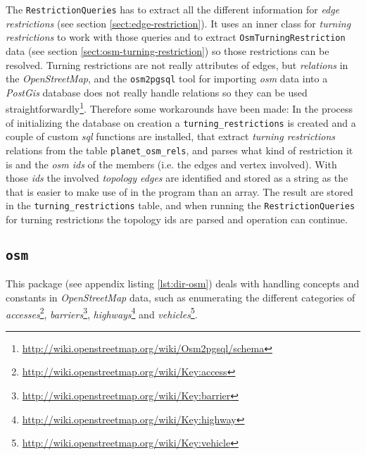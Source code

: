 \documentclass[../main.tex]{subfiles}
\begin{document}
The \texttt{RestrictionQueries} has to extract all the different information for \textit{edge restrictions} (see section \ref{sect:edge-restriction}). It uses an inner class for \textit{turning restrictions} to work with those queries and to extract \texttt{OsmTurningRestriction} data (see section \ref{sect:osm-turning-restriction}) so those restrictions can be resolved. Turning restrictions are not really attributes of edges, but \textit{relations} in the \textit{OpenStreetMap}, and the \texttt{osm2pgsql} tool for importing \textit{osm} data into a \textit{PostGis} database does not really handle relations so they can be used straightforwardly\footnote{\url{http://wiki.openstreetmap.org/wiki/Osm2pgsql/schema}}. Therefore some workarounds have been made: In the process of initializing the database on creation a \texttt{turning\_restrictions} is created and a couple of custom \textit{sql} functions are installed, that extract \textit{turning restrictions} relations from the table \texttt{planet\_osm\_rels}, and parses what kind of restriction it is and the \textit{osm ids} of the members (i.e. the edges and vertex involved). With those \textit{ids} the involved \textit{topology edges} are identified and stored as a string as the that is easier to make use of in the program than an array. The result are stored in the \texttt{turning\_restrictions} table, and when running the \texttt{RestrictionQueries} for turning restrictions the topology ids are parsed and operation can continue.

\subsection{\texttt{osm}}\label{package-osm}
This package (see appendix listing \ref{lst:dir-osm}) deals with handling concepts and constants in \textit{OpenStreetMap} data, such as enumerating the different categories of \textit{accesses}\footnote{\url{http://wiki.openstreetmap.org/wiki/Key:access}}, \textit{barriers}\footnote{\url{http://wiki.openstreetmap.org/wiki/Key:barrier}}, \textit{highways}\footnote{\url{http://wiki.openstreetmap.org/wiki/Key:highway}} and \textit{vehicles}\footnote{\url{http://wiki.openstreetmap.org/wiki/Key:vehicle}}. 
\end{document}
